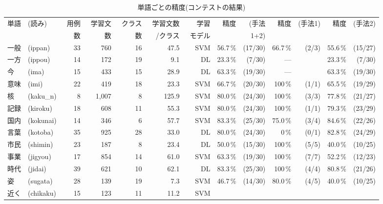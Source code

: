 \begin{table*}[htbp]
  \footnotesize
  \begin{center}
    \caption{単語ごとの精度(コンテストの結果)}
    \label{tab:result2}
    \begin{tabular}[c]{|l@{}l@{ }|@{ }r@{ }|@{ }r@{ }|@{ }r@{ }|@{ }r@{ }|@{ }r@{ }|r@{ }r@{ }|r@{}r@{ }|r@{ }r@{ }|}
      \hline
      単語 & (読み) & \ 用例 & \ 学習文 & \ クラス & \ 学習文数
      & 学習 & 精度 & (手法 & 精度 & (手法1) & 精度 & (手法2) \\
      & & 数 & 数 & 数 & /クラス & \ モデル & & 1+2) & & & & \\ 
      \hline
      一般 & (ippan) & 33 & 760 & 16 & 47.5 & SVM 
      & 56.7\,\% & (17/30) & 66.7\,\% & (2/3) & 55.6\,\% & (15/27)\\
      一方 & (ippou) & 14 & 172 & 19 & 9.1 & DL 
      & 23.3\,\% & (7/30) & --- & & 23.3\,\% & (7/30) \\
      今 & (ima) & 15 & 433 & 15 & 28.9 & DL 
      & 63.3\,\% & (19/30) & --- & & 63.3\,\% & (19/30) \\
      意味 & (imi) & 22 & 419 & 18 & 23.3 & SVM 
      & 66.7\,\% & (20/30) & 100\,\% & (1/1) & 65.5\,\% & (19/29) \\
      核 & (kaku\_n) & 8 & 1,007 & 8 & 125.9 & SVM 
      & 80.0\,\% & (24/30) & 100\,\% & (3/3) & 77.8\,\% & (21/27) \\
      記録 & (kiroku) & 18 & 608 & 11 & 55.3 & SVM 
      & 80.0\,\% & (24/30) & 100\,\% & (1/1) & 79.3\,\% & (23/29) \\
      国内 & (kokunai) & 14 & 346 & 6 & 57.7 & SVM 
      & 83.3\,\% & (25/30) & 75.0\,\% & (3/4) & 84.6\,\% & (22/26) \\
      言葉 & (kotoba) & 35 & 925 & 28 & 33.0 & DL 
      & 80.0\,\% & (24/30) & 0\,\% & (0/1) & 82.8\,\% & (24/29) \\
      市民 & (shimin) & 23 & 187 & 8 & 23.4 & DL 
      & 50.0\,\% & (15/30) & 100\,\% & (5/5) & 40.0\,\% & (10/25) \\
      事業 & (jigyou) & 17 & 854 & 14 & 61.0 & SVM 
      & 63.3\,\% & (19/30) & 100\,\% & (7/7) & 52.2\,\% & (12/23) \\
      時代 & (jidai) & 39 & 621 & 10 & 62.1 & DL 
      & 83.3\,\% & (25/30) & 100\,\% & (4/4) & 80.8\,\% & (21/26) \\
      姿 & (sugata) & 28 & 139 & 19 & 7.3 & SVM 
      & 46.7\,\% & (14/30) & 80.0\,\% & (4/5) & 40.0\,\% & (10/25) \\
      近く & (chikaku) & 15 & 123 & 11 & 11.2 & SVM 

\end{tabular}
\end{center}
\end{table*}
